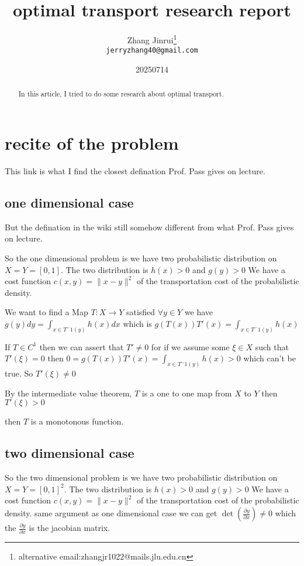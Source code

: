 \documentclass{article}
\title{optimal transport research report}
\author{Zhang Jinrui\thanks{alternative email:zhangjr1022@mails.jlu.edu.cn} \\ \texttt{jerryzhang40@gmail.com}}
\date{20250714}  %
\theoremstyle{definition} %
\begin{document}
\maketitle

\begin{abstract}
    In this article, I tried to do some research
    about optimal transport.
\end{abstract}

\section{recite of the problem}
This link \cite[Transportation-theory]{Transportation-theory}
is what I find the closest defination
Prof. Pass gives on lecture.

\subsection{one dimensional case}

But the defination in the wiki still
somehow different from what Prof. Pass
gives on lecture.

So the one dimensional
problem is we have two
probabilistic distribution on
$X=Y=[0, 1]$.
The two distribution is
$h(x)>0$ and $g(y)>0$
We have a cost function
$c(x,y)=\lVert x-y \rVert^2$ of the
transportation cost of the
probabilistic density.

We want to find a Map $T: X \to Y$
satisfied $\forall y\in Y$ we have
$g(y)dy=\int_{x \in T^-1(y)}h(x)dx$
which is
$g(T(x))T'(x)=\int_{x \in T^-1(y)}h(x)$

If $T\in C^1$ then we can assert that
$T'\ne 0$ for if we assume some $\xi\in X$
such that $T'(\xi)=0$ then
$0=g(T(x))T'(x)=\int_{x \in T^-1(y)}h(x)>0$
which can't be true.
So $T'(\xi)\ne0$

By the intermediate value theorem,
$T$ is a one to one map from $X$
to $Y$ then $T'(\xi)>0$

then $T$ is a monotonous function.

\subsection{two dimensional case}
So the two dimensional
problem is we have two
probabilistic distribution on
$X=Y=[0, 1]^2$.
The two distribution is
$h(x)>0$ and $g(y)>0$
We have a cost function
$c(x,y)=\lVert x-y \rVert^2$ of the
transportation cost of the
probabilistic density.
same argument as one dimensional case
we can get
$\det(\frac{\partial y}{\partial x})\ne0$
which the $\frac{\partial y}{\partial x}$
is the jacobian matrix.
\end{document}
